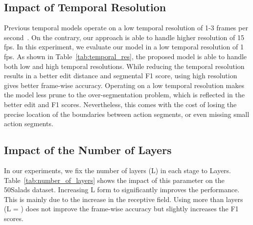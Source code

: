 \documentclass[10pt,twocolumn,letterpaper]{article}
\begin{document}
\subsection{Impact of Temporal Resolution}

Previous temporal models operate on a low temporal resolution of 1-3 frames 
per second~\cite{Lea_2017_CVPR, lei2018temporal, ding2018weakly}. On the 
contrary, our approach is able to handle higher resolution of 15 fps. 
In this experiment, we evaluate our model in a low temporal resolution of 
1 fps. As shown in Table~\ref{tab:temporal_res}, the proposed model is able 
to handle both low and high temporal resolutions. While reducing the 
temporal resolution results in a better edit distance and segmental F1 score, 
using high resolution gives better frame-wise accuracy. Operating on a low 
temporal resolution makes the model less prune to the over-segmentation problem, 
which is reflected in the better edit and F1 scores. Nevertheless, this comes 
with the cost of losing the precise location of the boundaries between action 
segments, or even missing small action segments.

\begin{table}[tb]
\centering
{}
\caption{Impact of temporal resolution on the 50Salads dataset.}
\label{tab:temporal_res}
\end{table}



\subsection{Impact of the Number of Layers}
In our experiments, we fix the number of layers (L) in each stage to  Layers. 
Table~\ref{tab:number_of_layers} shows the impact of this parameter on 
the 50Salads dataset. Increasing L form  to  significantly 
improves the performance. This is mainly due to the increase in the 
receptive field. Using more than  layers (L = ) does not improve 
the frame-wise accuracy but slightly increases the F1 scores.
\end{document}
